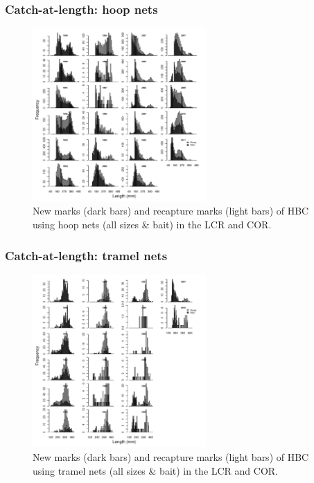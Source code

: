 \documentclass{beamer}
\begin{document}
\begin{frame}
	\frametitle{Catch-at-length: hoop nets}
	\begin{figure}[htbp]
		\centering
			\includegraphics[height=2.6in]{../../FIGS/LSMR/fig:MarksAtLengthHOOP.pdf}
		\caption{New marks (dark bars) and recapture marks (light bars) of HBC using hoop nets (all sizes \& bait) in the LCR and COR.}
		\label{fig:FIGS_LSMR_fig:MarksAtLengthHOOP}
	\end{figure}
	
\end{frame}
\begin{frame}
	\frametitle{Catch-at-length: tramel nets}
	\begin{figure}[htbp]
		\centering
			\includegraphics[height=2.6in]{../../FIGS/LSMR/fig:MarksAtLengthGILL.pdf}
		\caption{New marks (dark bars) and recapture marks (light bars) of HBC using tramel nets (all sizes \& bait) in the LCR and COR.}
		\label{fig:FIGS_LSMR_fig:MarksAtLengthHOOP}
	\end{figure}
\end{frame}

\end{document}
